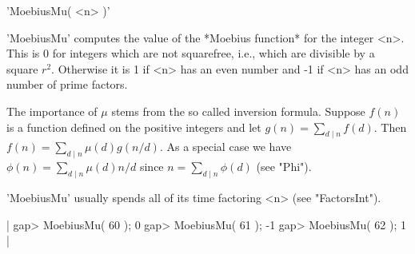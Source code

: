 %

'MoebiusMu( <n> )'

'MoebiusMu' computes the value of the *Moebius  function* for the integer
<n>.  This is 0  for  integers which  are not squarefree, i.e., which are
divisible by a square $r^2$.  Otherwise it is 1 if <n> has an even number
and -1 if <n> has an odd number of prime factors.

The importance   of $\mu$ stems  from the   so called  inversion formula.
Suppose $f(n)$  is a function  defined on the  positive integers and  let
$g(n)=\sum_{d \mid n}{f(d)}$. Then $f(n)=\sum_{d \mid n}{\mu(d) g(n/d)}$.
As a special case we have  $\phi(n) = \sum_{d  \mid n}{\mu(d) n/d}$ since
$n = \sum_{d \mid n}{\phi(d)}$ (see "Phi").

'MoebiusMu' usually   spends  all of   its    time   factoring <n>   (see
"FactorsInt").

|    gap> MoebiusMu( 60 );
    0
    gap> MoebiusMu( 61 );
    -1
    gap> MoebiusMu( 62 );
    1 |




